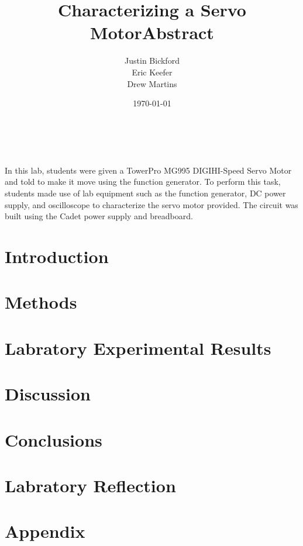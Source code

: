 \documentclass[11pt]{article}
\title{Characterizing a Servo Motor}
\author{Justin Bickford\\Eric Keefer\\Drew Martins}
\date{\today}
\begin{document}
\maketitle
\pagebreak
\tableofcontents
\pagebreak

\title{Abstract}
\\ \\
In this lab, students were given a TowerPro MG995 DIGIHI-Speed Servo Motor and told to make it move using the function generator. To perform this task, students made use of lab equipment such as the function generator, DC power supply, and oscilloscope to characterize the servo motor provided. The circuit was built using the Cadet power supply and breadboard.

\section{Introduction}

\section{Methods}

\section{Labratory Experimental Results}

\section{Discussion}

\section{Conclusions}

\section{Labratory Reflection}

\section{Appendix}
\end{document}
